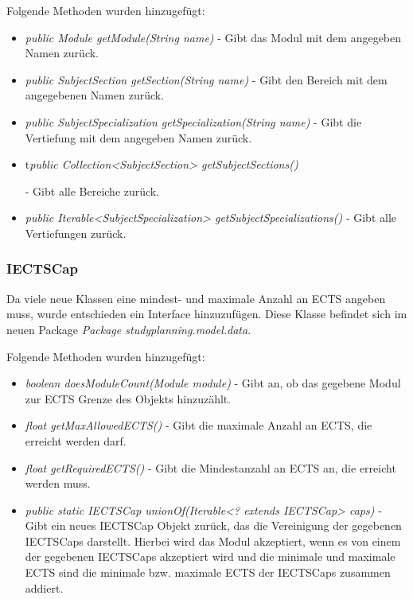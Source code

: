 \documentclass[parskip=full]{scrartcl}
\begin{document}
				 Folgende Methoden wurden hinzugefügt:
				 \begin{itemize}
				 	\item \textit{public Module getModule(String name)} - Gibt das Modul mit dem angegeben Namen zurück.
				 	\item \textit{public SubjectSection getSection(String name)} - Gibt den Bereich mit dem angegebenen Namen zurück.
				 	\item \textit{public SubjectSpecialization getSpecialization(String name)} - Gibt die Vertiefung mit dem angegeben Namen zurück. 
				 	\item \hypertarget{model:DataSet:getSection}{t\textit{public Collection<SubjectSection> getSubjectSections()}} - Gibt alle Bereiche zurück.
				 	\item \textit{\textit{public Iterable<SubjectSpecialization> getSubjectSpecializations()}} - Gibt alle Vertiefungen zurück.
				 \end{itemize}
			
			\subsubsection{IECTSCap}
			\hypertarget{model:IECTSCap}{}
			Da viele neue Klassen eine mindest- und maximale Anzahl an ECTS angeben muss, wurde entschieden ein Interface hinzuzufügen.
			Diese Klasse befindet sich im neuen Package \textit{Package studyplanning.model.data}.
			
			Folgende Methoden wurden hinzugefügt:
			\begin{itemize}
				\item \textit{boolean doesModuleCount(Module module)} - Gibt an, ob das gegebene Modul zur ECTS Grenze des Objekts hinzuzählt.
				\item \textit{float getMaxAllowedECTS()} - Gibt die maximale Anzahl an ECTS, die erreicht werden darf.
				\item \textit{float getRequiredECTS()} - Gibt die Mindestanzahl an ECTS an, die erreicht werden muss.
				\item \textit{public static IECTSCap unionOf(Iterable<? extends IECTSCap> caps)} - Gibt ein neues IECTSCap Objekt zurück, das die Vereinigung der gegebenen IECTSCaps darstellt. Hierbei wird das Modul akzeptiert, wenn es von einem der gegebenen IECTSCaps akzeptiert wird und die minimale und maximale ECTS sind die minimale bzw. maximale ECTS der IECTSCaps zusammen addiert.
			\end{itemize}
			
\end{document}
